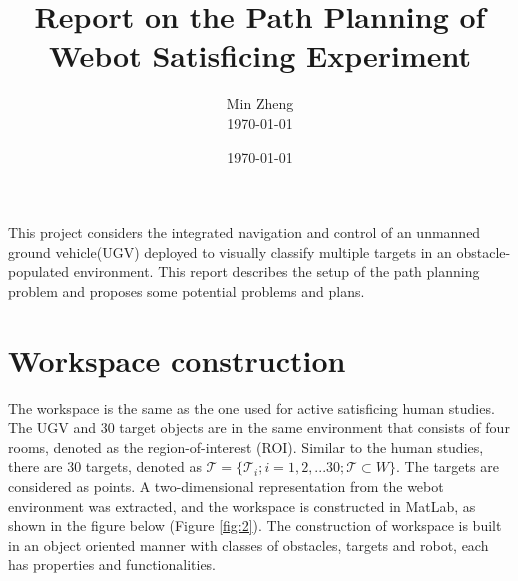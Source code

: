 \documentclass[12pt,draftcls,onecolumn]{IEEEtran}
\begin{document}
\title{Report on the Path Planning of Webot Satisficing Experiment }


\author{  Min Zheng \\  \today}

\date{\today}

\maketitle




This project considers the integrated navigation and control of an unmanned ground vehicle(UGV) deployed to visually classify multiple targets in an obstacle-populated environment. 
This report describes the setup of the path planning problem and proposes some potential problems and plans. 

\section{Workspace construction} 

The workspace is the same as the one used for active satisficing human studies. 
The UGV and 30 target objects are in the same environment that consists of four rooms, denoted as the region-of-interest (ROI).
Similar to the human studies, there are 30 targets, denoted as $\mathcal{T} = \{\mathcal{T}_i; i = 1,2,...30; \mathcal{T} \subset W \}$.
The targets are considered as points.
A two-dimensional representation from the webot environment was extracted, and the workspace is constructed in MatLab, as shown in the figure below  (Figure \ref{fig:2}). 
The construction of workspace is built in an object oriented manner with classes of obstacles, targets and robot, each has properties and functionalities.  
\end{document}

